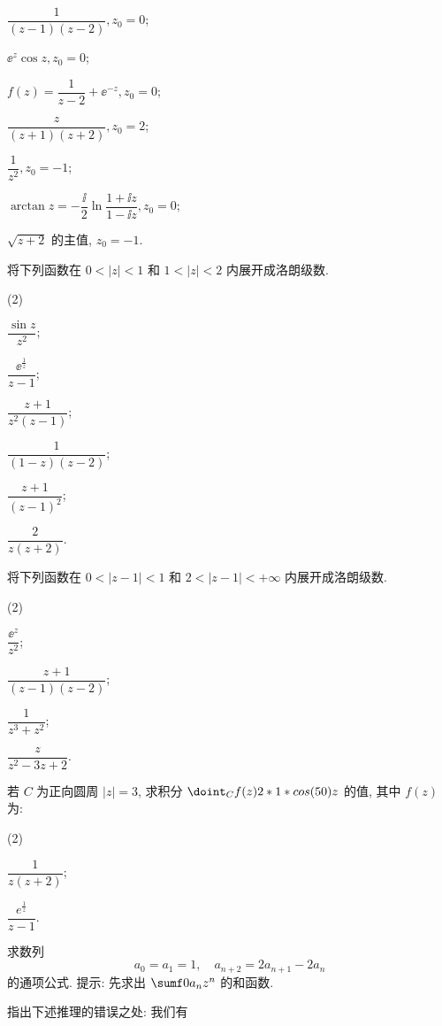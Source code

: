 \begin{homework}
\begin{homework}
\begin{subhomework}
      \item $\dfrac{1}{(z-1)(z-2)}, z_0=0$;
      \item $\ee^z\cos z, z_0=0$;
      \item $f(z)=\dfrac{1}{z-2}+\ee^{-z}, z_0=0$;
      \item $\dfrac{z}{(z+1)(z+2)}, z_0=2$;
      \smallskip
      \item $\dfrac1{z^2}, z_0=-1$;
      \item $\arctan z=-\dfrac\ii2\ln\dfrac{1+\ii z}{1-\ii z}, z_0=0$;
      \item $\sqrt{z+2}$ 的主值, $z_0=-1$.
    \end{subhomework}
    \item 将下列函数在 $0<|z|<1$ 和 $1<|z|<2$ 内展开成洛朗级数.
      \begin{subhomework}(2)
        \item $\dfrac{\sin z}{z^2}$;
        \item $\dfrac{\ee^{\frac1z}}{z-1}$;
        \item $\dfrac{z+1}{z^2(z-1)}$;
        \item $\dfrac1{(1-z)(z-2)}$;
        \item $\dfrac{z+1}{(z-1)^2}$;
        \item $\dfrac{2}{z(z+2)}$.
      \end{subhomework}
    \item 将下列函数在 $0<|z-1|<1$ 和 $2<|z-1|<+\infty$ 内展开成洛朗级数.
      \begin{subhomework}(2)
        \item $\dfrac{\ee^z}{z^2}$;
        \item $\dfrac{z+1}{(z-1)(z-2)}$;
        \item $\dfrac{1}{z^3+z^2}$;
        \item $\dfrac{z}{z^2-3z+2}$.
      \end{subhomework}
    \item 若 $C$ 为正向圆周 $|z|=3$, 求积分 $\doint_Cf(z)\d z$ 的值, 其中 $f(z)$ 为:
      \begin{subhomework}(2)
        \item $\dfrac1{z(z+2)}$;
        \item $\dfrac{e^{\frac1z}}{z-1}$.
      \end{subhomework}
    \item 求数列
      \[
        a_0=a_1=1,\quad a_{n+2}=2a_{n+1}-2a_n
      \]
      的通项公式.
      提示: 先求出 $\sumf0 a_n z^n$ 的和函数.
    \item 指出下述推理的错误之处: 我们有

\end{homework}
\end{homework}

